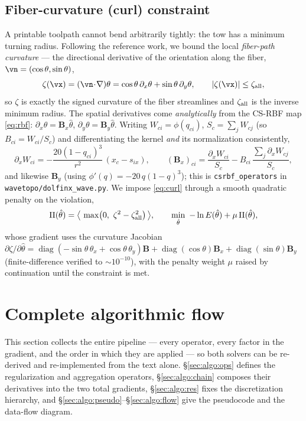 \documentclass[11pt]{article}
\begin{document}
\subsection{Fiber-curvature (curl) constraint}
\label{sec:curl}
A printable toolpath cannot bend arbitrarily tightly: the tow has a minimum
turning radius. Following the reference work, we bound the local
\emph{fiber-path curvature} --- the directional derivative of the orientation
along the fiber, $\vn=(\cos\theta,\sin\theta)$,
\begin{equation}
  \zeta(\vx)=(\vn\!\cdot\!\nabla)\theta
  =\cos\theta\,\partial_x\theta+\sin\theta\,\partial_y\theta,\qquad
  |\zeta(\vx)|\le\zeta_{\rm all},
  \label{eq:curl}
\end{equation}
so $\zeta$ is exactly the signed curvature of the fiber streamlines and
$\zeta_{\rm all}$ is the inverse minimum radius. The spatial derivatives come
\emph{analytically} from the CS-RBF map \eqref{eq:rbf}:
$\partial_x\theta=\mathbf B_x\hat\theta$, $\partial_y\theta=\mathbf B_y\hat\theta$.
Writing $W_{ci}=\phi(q_{ci})$, $S_c=\sum_j W_{cj}$ (so $B_{ci}=W_{ci}/S_c$) and
differentiating the kernel \emph{and} its normalization consistently,
\begin{equation}
  \partial_x W_{ci}=-\frac{20(1-q_{ci})^3}{r^2}\,(x_c-s_{ix}),\qquad
  (\mathbf B_x)_{ci}=\frac{\partial_x W_{ci}}{S_c}
  -B_{ci}\,\frac{\sum_j\partial_x W_{cj}}{S_c},
  \label{eq:rbfderiv}
\end{equation}
and likewise $\mathbf B_y$ (using $\phi'(q)=-20\,q(1-q)^3$); this is
\texttt{csrbf\_operators} in \texttt{wavetopo/dolfinx\_wave.py}. We impose
\eqref{eq:curl} through a
smooth quadratic penalty on the violation,
\begin{equation}
  \Pi(\hat\theta)=\big\langle\,\max\!\big(0,\ \zeta^2-\zeta_{\rm all}^2\big)\,\big\rangle,
  \qquad
  \min_{\hat\theta}\ -\ln E(\hat\theta)+\mu\,\Pi(\hat\theta),
\end{equation}
whose gradient uses the curvature Jacobian
$\partial\zeta/\partial\hat\theta=\operatorname{diag}(-\sin\theta\,\theta_x+\cos
\theta\,\theta_y)\mathbf B+\operatorname{diag}(\cos\theta)\mathbf B_x
+\operatorname{diag}(\sin\theta)\mathbf B_y$ (finite-difference verified to
$\sim\!10^{-10}$), with the penalty weight $\mu$ raised by continuation until the
constraint is met.

\section{Complete algorithmic flow}
\label{sec:algo}
This section collects the entire pipeline --- every operator, every factor in the
gradient, and the order in which they are applied --- so both solvers can be
re-derived and re-implemented from the text alone.
\S\ref{sec:algo:ops} defines the regularization and aggregation operators,
\S\ref{sec:algo:chain} composes their derivatives into the two total gradients,
\S\ref{sec:algo:res} fixes the discretization hierarchy, and
\S\ref{sec:algo:pseudo}--\S\ref{sec:algo:flow} give the pseudocode and the
data-flow diagram.
\end{document}
